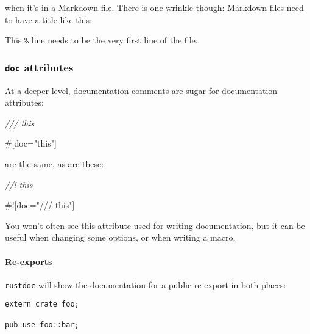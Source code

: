\documentclass[a4paper,]{book}
\newenvironment{Shaded}{\begin{snugshade}}{\end{snugshade}}
\newcommand{\StringTok}[1]{\textcolor[rgb]{0.31,0.60,0.02}{{#1}}}
\newcommand{\CommentTok}[1]{\textcolor[rgb]{0.56,0.35,0.01}{\textit{{#1}}}}
\newcommand{\OtherTok}[1]{\textcolor[rgb]{0.56,0.35,0.01}{{#1}}}
\newcommand{\NormalTok}[1]{{#1}}
\begin{document}
when it's in a Markdown file. There is one wrinkle though: Markdown
files need to have a title like this:

\begin{Shaded}
\end{Shaded}

This \texttt{\%} line needs to be the very first line of the file.

\subsubsection{\texorpdfstring{\texttt{doc}
attributes}{doc attributes}}\label{doc-attributes}

At a deeper level, documentation comments are sugar for documentation
attributes:

\begin{Shaded}
\begin{Highlighting}[]
\CommentTok{/// this}

\OtherTok{#[}\NormalTok{doc}\OtherTok{=}\StringTok{"this"}\OtherTok{]}
\end{Highlighting}
\end{Shaded}

are the same, as are these:

\begin{Shaded}
\begin{Highlighting}[]
\CommentTok{//! this}

\NormalTok{#![doc=}\StringTok{"/// this"}\NormalTok{]}
\end{Highlighting}
\end{Shaded}

You won't often see this attribute used for writing documentation, but
it can be useful when changing some options, or when writing a macro.

\paragraph{Re-exports}\label{re-exports}

\texttt{rustdoc} will show the documentation for a public re-export in
both places:

\begin{verbatim}
extern crate foo;

pub use foo::bar;
\end{verbatim}
\end{document}
